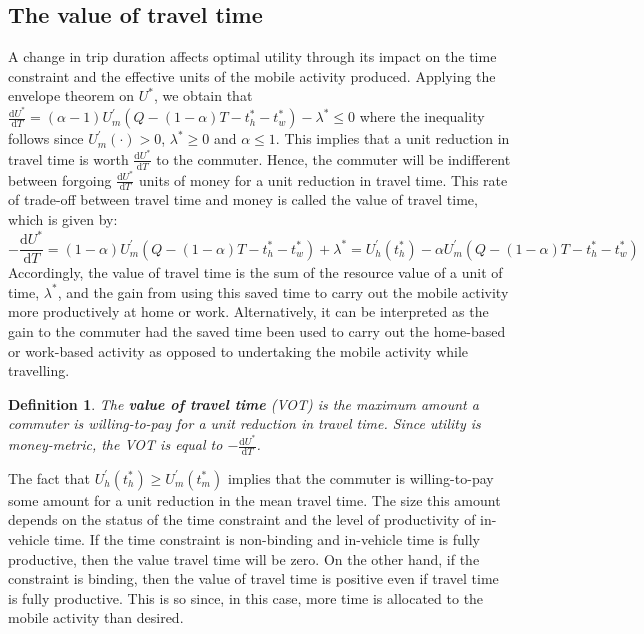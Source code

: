 \documentclass[12pt,a4paper,british]{article}
\newtheorem{definition}{Definition}[section]
\begin{document}
\subsection{The value of travel time}

A change in trip duration affects optimal utility through its impact on the time constraint and the effective units of the mobile activity produced. Applying the envelope theorem on $U^{\ast}$, we obtain that $\frac{\mathrm{d}U^{\ast}}{\mathrm{d}T}=\left(\alpha-1\right)U_{m}^{\prime}\left(Q-\left(1-\alpha\right)T-t_{h}^{\ast}-t_{w}^{\ast}\right)-\lambda^{\ast}\leq0$ where the inequality follows since $U_{m}^{\prime}\left(\cdot\right)>0$, $\lambda^{\ast}\geq0$ and $\alpha\leq1$. This implies that a unit reduction in travel time is worth $\frac{\mathrm{d}U^{\ast}}{\mathrm{d}T}$ to the commuter. Hence, the commuter will be indifferent between forgoing
$\frac{\mathrm{d}U^{\ast}}{\mathrm{d}T}$ units of money for a unit reduction in travel time. This rate of trade-off between travel time
and money is called the value of travel time, which is given by:%
\begin{equation}
-\frac{\mathrm{d}U^{\ast}}{\mathrm{d}T}=\left(1-\alpha\right)U_{m}^{\prime}\left(Q-\left(1-\alpha\right)T-t_{h}^{\ast}-t_{w}^{\ast}\right)+\lambda^{\ast}=U_{h}^{\prime}\left(t_{h}^{*}\right)-\alpha U_{m}^{\prime}\left(Q-\left(1-\alpha\right)T-t_{h}^{\ast}-t_{w}^{\ast}\right)\label{eq:VOT_det}
\end{equation}
Accordingly, the value of travel time is the sum of the resource value of a unit of time, $\lambda^{\ast}$, and the gain from using this
saved time to carry out the mobile activity more productively at home or work. Alternatively, it can be interpreted as the gain to the commuter had the saved time been used to carry out the home-based or work-based activity as opposed to undertaking the mobile activity while travelling.

\begin{definition}
The \textbf{\textit{value of travel time}} (VOT) is the maximum amount a commuter is willing-to-pay for a unit reduction in travel time. Since utility is money-metric, the VOT is equal to $-\frac{ \mathrm{d} U^{\ast} } {\mathrm{d}T}$.
\end{definition}

The fact that $U_{h}^{\prime}\left(t_{h}^{*}\right)\geq U_{m}^{\prime}\left(t_{m}^{\ast}\right)$ implies that the commuter is willing-to-pay some amount for a unit reduction in the mean travel time. The size this amount depends on the status of the time constraint and the level of productivity of in-vehicle time. If the time constraint is non-binding and in-vehicle time is fully productive, then the value travel time will be zero. On the other hand, if the constraint is binding, then the value of travel time is positive even if travel time is fully productive. This is so since, in this case, more time is allocated to the mobile activity than desired. 
\end{document}
